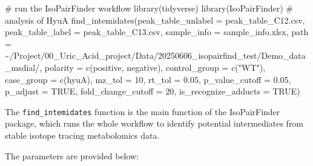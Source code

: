 \documentclass[
  letterpaper,
  DIV=11,
  numbers=noendperiod]{scrreprt}
\newenvironment{Shaded}{\begin{snugshade}}{\end{snugshade}}
\newcommand{\AttributeTok}[1]{\textcolor[rgb]{0.40,0.45,0.13}{#1}}
\newcommand{\CommentTok}[1]{\textcolor[rgb]{0.37,0.37,0.37}{#1}}
\newcommand{\ConstantTok}[1]{\textcolor[rgb]{0.56,0.35,0.01}{#1}}
\newcommand{\DecValTok}[1]{\textcolor[rgb]{0.68,0.00,0.00}{#1}}
\newcommand{\FloatTok}[1]{\textcolor[rgb]{0.68,0.00,0.00}{#1}}
\newcommand{\FunctionTok}[1]{\textcolor[rgb]{0.28,0.35,0.67}{#1}}
\newcommand{\NormalTok}[1]{\textcolor[rgb]{0.00,0.23,0.31}{#1}}
\newcommand{\StringTok}[1]{\textcolor[rgb]{0.13,0.47,0.30}{#1}}
\begin{document}
\begin{Shaded}
\begin{Highlighting}[]
\CommentTok{\# run the IsoPairFinder workflow}
\FunctionTok{library}\NormalTok{(tidyverse)}
\FunctionTok{library}\NormalTok{(IsoPairFinder)}
\CommentTok{\# analysis of HyuA}
\FunctionTok{find\_intemidates}\NormalTok{(}\AttributeTok{peak\_table\_unlabel =} \StringTok{\textquotesingle{}peak\_table\_C12.csv\textquotesingle{}}\NormalTok{,}
                 \AttributeTok{peak\_table\_label =} \StringTok{\textquotesingle{}peak\_table\_C13.csv\textquotesingle{}}\NormalTok{,}
                 \AttributeTok{sample\_info =} \StringTok{\textquotesingle{}sample\_info.xlsx\textquotesingle{}}\NormalTok{,}
                 \AttributeTok{path =} \StringTok{\textquotesingle{}\textasciitilde{}/Project/00\_Uric\_Acid\_project/Data/20250606\_isopairfind\_test/Demo\_data\_msdial/\textquotesingle{}}\NormalTok{,}
                 \AttributeTok{polarity =} \FunctionTok{c}\NormalTok{(}\StringTok{\textquotesingle{}positive\textquotesingle{}}\NormalTok{, }\StringTok{\textquotesingle{}negative\textquotesingle{}}\NormalTok{),}
                 \AttributeTok{control\_group =} \FunctionTok{c}\NormalTok{(}\StringTok{"WT"}\NormalTok{),}
                 \AttributeTok{case\_group =} \FunctionTok{c}\NormalTok{(}\StringTok{\textquotesingle{}hyuA\textquotesingle{}}\NormalTok{),}
                 \AttributeTok{mz\_tol =} \DecValTok{10}\NormalTok{,}
                 \AttributeTok{rt\_tol =} \FloatTok{0.05}\NormalTok{,}
                 \AttributeTok{p\_value\_cutoff =} \FloatTok{0.05}\NormalTok{,}
                 \AttributeTok{p\_adjust =} \ConstantTok{TRUE}\NormalTok{,}
                 \AttributeTok{fold\_change\_cutoff =} \DecValTok{20}\NormalTok{,}
                 \AttributeTok{is\_recognize\_adducts =} \ConstantTok{TRUE}\NormalTok{)}
\end{Highlighting}
\end{Shaded}

The \texttt{find\_intemidates} function is the main function of the
IsoPairFinder package, which runs the whole workflow to identify
potential intermediates from stable isotope tracing metabolomics data.

The parameters are provided below:
\end{document}
